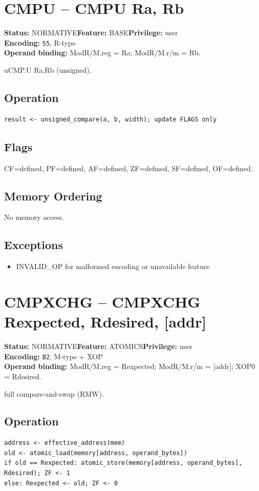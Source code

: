\documentclass[10pt]{article}
\begin{document}
\section{CMPU -- CMPU Ra, Rb}
\textbf{Status:} NORMATIVE\quad \textbf{Feature:} BASE\quad \textbf{Privilege:} user\\
\textbf{Encoding:} \texttt{55}, R-type\\
\textbf{Operand binding:} ModR/M.reg = Ra; ModR/M.r/m = Rb.

uCMP.U Ra,Rb (unsigned).

\subsection*{Operation}
\begin{lstlisting}
result <- unsigned_compare(a, b, width); update FLAGS only
\end{lstlisting}
\subsection*{Flags}
CF=defined, PF=defined, AF=defined, ZF=defined, SF=defined, OF=defined.
\subsection*{Memory Ordering}
No memory access.
\subsection*{Exceptions}
\begin{itemize}
\item INVALID\_OP for malformed encoding or unavailable feature
\end{itemize}
\clearpage

\section{CMPXCHG -- CMPXCHG Rexpected, Rdesired, [addr]}
\textbf{Status:} NORMATIVE\quad \textbf{Feature:} ATOMICS\quad \textbf{Privilege:} user\\
\textbf{Encoding:} \texttt{B2}, M-type + XOP\\
\textbf{Operand binding:} ModR/M.reg = Rexpected; ModR/M.r/m = [addr]; XOP0 = Rdesired.

full compare-and-swap (RMW).

\subsection*{Operation}
\begin{lstlisting}
address <- effective_address(mem)
old <- atomic_load(memory[address, operand_bytes])
if old == Rexpected: atomic_store(memory[address, operand_bytes], Rdesired); ZF <- 1
else: Rexpected <- old; ZF <- 0
\end{lstlisting}
\end{document}

